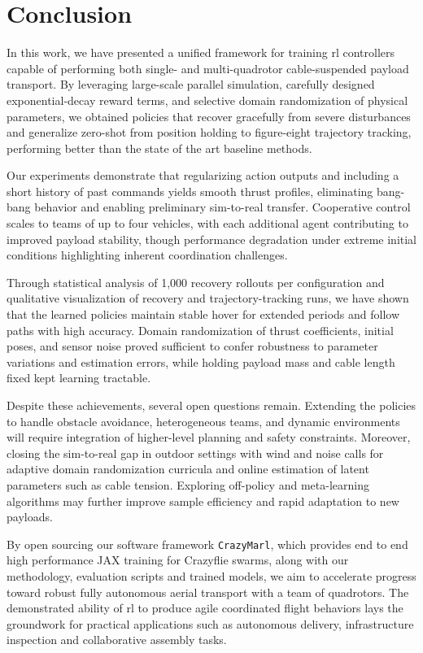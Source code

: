 \chapter{Conclusion}

In this work, we have presented a unified framework for training \gls{rl} controllers capable of performing both single- and multi-quadrotor cable-suspended payload transport. By leveraging large-scale parallel simulation, carefully designed exponential-decay reward terms, and selective domain randomization of physical parameters, we obtained policies that recover gracefully from severe disturbances and generalize zero-shot from position holding to figure-eight trajectory tracking, performing better than the state of the art baseline methods.

Our experiments demonstrate that regularizing action outputs and including a short history of past commands yields smooth thrust profiles, eliminating bang-bang behavior and enabling preliminary sim-to-real transfer. Cooperative control scales to teams of up to four vehicles, with each additional agent contributing to improved payload stability, though performance degradation under extreme initial conditions highlighting inherent coordination challenges.

Through statistical analysis of 1,000 recovery rollouts per configuration and qualitative visualization of recovery and trajectory-tracking runs, we have shown that the learned policies maintain stable hover for extended periods and follow paths with high accuracy. Domain randomization of thrust coefficients, initial poses, and sensor noise proved sufficient to confer robustness to parameter variations and estimation errors, while holding payload mass and cable length fixed kept learning tractable.

Despite these achievements, several open questions remain. Extending the policies to handle obstacle avoidance, heterogeneous teams, and dynamic environments will require integration of higher-level planning and safety constraints. Moreover, closing the sim-to-real gap in outdoor settings with wind and noise calls for adaptive domain randomization curricula and online estimation of latent parameters such as cable tension. Exploring off-policy and meta-learning algorithms may further improve sample efficiency and rapid adaptation to new payloads.

By open sourcing our software framework \texttt{CrazyMarl}, which provides end to end high performance JAX training for Crazyflie swarms, along with our methodology, evaluation scripts and trained models, we aim to accelerate progress toward robust fully autonomous aerial transport with a team of quadrotors. The demonstrated ability of \gls{rl} to produce agile coordinated flight behaviors lays the groundwork for practical applications such as autonomous delivery, infrastructure inspection and collaborative assembly tasks.